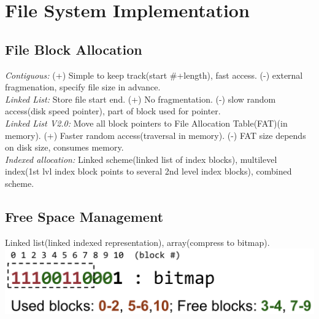 \section{File System Implementation}
\subsection*{File Block Allocation}
\emph{Contiguous:} (+) Simple to keep track(start \#+length), fast access. (-) external fragmenation, specify file size in advance.\\
\emph{Linked List:} Store file start end. (+) No fragmentation. (-) slow random access(disk speed pointer), part of block used for pointer.\\
\emph{Linked List V2.0:} Move all block pointers to File Allocation Table(FAT)(in memory). (+) Faster random access(traversal in memory). (-) FAT size depends on disk size, consumes memory.\\
\emph{Indexed allocation:} Linked scheme(linked list of index blocks), multilevel index(1st lvl index block points to several 2nd level index blocks), combined scheme.

\subsection*{Free Space Management}
Linked list(linked indexed representation), array(compress to bitmap).\\
\includegraphics[width=0.75\linewidth]{images/bitmap-free-block}

